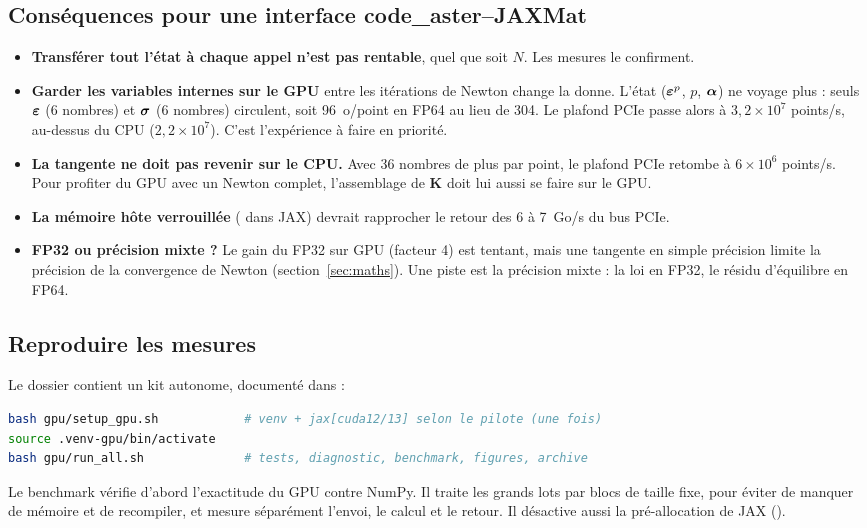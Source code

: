 \subsection{Conséquences pour une interface code\_aster--JAXMat}

\begin{itemize}
  \item \textbf{Transférer tout l'état à chaque appel n'est pas rentable}, quel que soit $N$. Les mesures le confirment.
  \item \textbf{Garder les variables internes sur le GPU} entre les itérations de Newton change la donne. L'état ($\boldsymbol{\varepsilon}^{p}$, $p$, $\boldsymbol{\alpha}$) ne voyage plus : seuls $\boldsymbol{\varepsilon}$ (6 nombres) et $\boldsymbol{\sigma}$ (6 nombres) circulent, soit 96~o/point en FP64 au lieu de 304. Le plafond PCIe passe alors à $3{,}2\times10^7$ points/s, au-dessus du CPU ($2{,}2\times10^7$). C'est l'expérience à faire en priorité.
  \item \textbf{La tangente ne doit pas revenir sur le CPU.} Avec 36 nombres de plus par point, le plafond PCIe retombe à $6\times10^6$ points/s. Pour profiter du GPU avec un Newton complet, l'assemblage de $\mathbf{K}$ doit lui aussi se faire sur le GPU.
  \item \textbf{La mémoire hôte verrouillée} ( dans JAX) devrait rapprocher le retour des 6 à 7~Go/s du bus PCIe.
  \item \textbf{FP32 ou précision mixte ?} Le gain du FP32 sur GPU (facteur 4) est tentant, mais une tangente en simple précision limite la précision de la convergence de Newton (section~\ref{sec:maths}). Une piste est la précision mixte : la loi en FP32, le résidu d'équilibre en FP64.
\end{itemize}

\subsection{Reproduire les mesures}\label{sec:protocole-gpu}

Le dossier  contient un kit autonome, documenté dans  :
\begin{lstlisting}[language=bash]
bash gpu/setup_gpu.sh            # venv + jax[cuda12/13] selon le pilote (une fois)
source .venv-gpu/bin/activate
bash gpu/run_all.sh              # tests, diagnostic, benchmark, figures, archive
\end{lstlisting}
Le benchmark vérifie d'abord l'exactitude du GPU contre NumPy. Il traite les grands lots par blocs de taille fixe, pour éviter de manquer de mémoire et de recompiler, et mesure séparément l'envoi, le calcul et le retour. Il désactive aussi la pré-allocation de JAX ().
